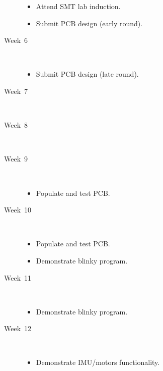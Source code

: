 \begin{description}
  \begin{itemize}
  \item Attend SMT lab induction.
  \item Submit PCB design (early round).
  \end{itemize}
  
  
\item [Week~6]\mbox{}\\  
  
  \begin{itemize}
  \item Submit PCB design (late round).
  \end{itemize}
  
  
\item [Week~7]\mbox{}\\
  
  
\item [Week~8]\mbox{}\\  
  
\item [Week~9]\mbox{}\\
  
  \begin{itemize}
  \item Populate and test PCB.
  \end{itemize}  
  
  
\item [Week~10]\mbox{}\\

  \begin{itemize}
  \item Populate and test PCB.
  \item Demonstrate blinky program.
  \end{itemize}

\item [Week~11]\mbox{}\\  

  \begin{itemize}
  \item Demonstrate blinky program.
  \end{itemize}  
 
\item [Week~12]\mbox{}\\
  
  \begin{itemize}
  \item Demonstrate IMU/motors functionality.
  \end{itemize}
  

\end{description}
